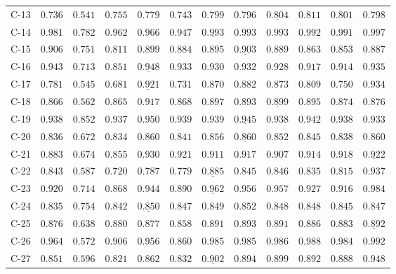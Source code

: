 {\begin{longtable}[t]{p{1cm}|p{1cm}|p{1cm}|p{1cm}|p{1cm}|p{1cm}|cccccc}
C-13 & $0.736$ & $0.541$ & $0.755$ & $0.779$ & $0.743$ & $0.799$ & $0.796$ & $\underline{0.804}$ & $\bm{0.811}$ & $0.801$ & $0.798$ \\
C-14 & $0.981$ & $0.782$ & $0.962$ & $0.966$ & $0.947$ & $\underline{0.993}$ & $0.993$ & $0.993$ & $0.992$ & $0.991$ & $\bm{0.997}$ \\
C-15 & $\bm{0.906}$ & $0.751$ & $0.811$ & $0.899$ & $0.884$ & $0.895$ & $\underline{0.903}$ & $0.889$ & $0.863$ & $0.853$ & $0.887$ \\
C-16 & $0.943$ & $0.713$ & $0.851$ & $\underline{0.948}$ & $0.933$ & $0.930$ & $0.932$ & $0.928$ & $0.917$ & $0.914$ & $0.935$ \\
C-17 & $0.781$ & $0.545$ & $0.681$ & $\underline{0.921}$ & $0.731$ & $0.870$ & $0.882$ & $0.873$ & $0.809$ & $0.750$ & $\bm{0.934}$ \\
C-18 & $0.866$ & $0.562$ & $0.865$ & $\bm{0.917}$ & $0.868$ & $0.897$ & $0.893$ & $\underline{0.899}$ & $0.895$ & $0.874$ & $0.876$ \\
C-19 & $0.938$ & $0.852$ & $0.937$ & $\bm{0.950}$ & $0.939$ & $0.939$ & $\underline{0.945}$ & $0.938$ & $0.942$ & $0.938$ & $0.933$ \\
C-20 & $0.836$ & $0.672$ & $0.834$ & $0.860$ & $0.841$ & $0.856$ & $\underline{0.860}$ & $0.852$ & $0.845$ & $0.838$ & $\bm{0.860}$ \\
C-21 & $0.883$ & $0.674$ & $0.855$ & $\bm{0.930}$ & $0.921$ & $0.911$ & $0.917$ & $0.907$ & $0.914$ & $0.918$ & $\underline{0.922}$ \\
C-22 & $0.843$ & $0.587$ & $0.720$ & $0.787$ & $0.779$ & $\underline{0.885}$ & $0.845$ & $0.846$ & $0.835$ & $0.815$ & $\bm{0.937}$ \\
C-23 & $0.920$ & $0.714$ & $0.868$ & $0.944$ & $0.890$ & $\underline{0.962}$ & $0.956$ & $0.957$ & $0.927$ & $0.916$ & $\bm{0.984}$ \\
C-24 & $0.835$ & $0.754$ & $0.842$ & $\underline{0.850}$ & $0.847$ & $0.849$ & $\bm{0.852}$ & $0.848$ & $0.848$ & $0.845$ & $0.847$ \\
C-25 & $0.876$ & $0.638$ & $0.880$ & $0.877$ & $0.858$ & $0.891$ & $\bm{0.893}$ & $0.891$ & $0.886$ & $0.883$ & $\underline{0.892}$ \\
C-26 & $0.964$ & $0.572$ & $0.906$ & $0.956$ & $0.860$ & $0.985$ & $0.985$ & $0.986$ & $0.988$ & $0.984$ & $\bm{0.992}$ \\
C-27 & $0.851$ & $0.596$ & $0.821$ & $0.862$ & $0.832$ & $\underline{0.902}$ & $0.894$ & $0.899$ & $0.892$ & $0.888$ & $\bm{0.948}$ \\

\end{longtable}}
